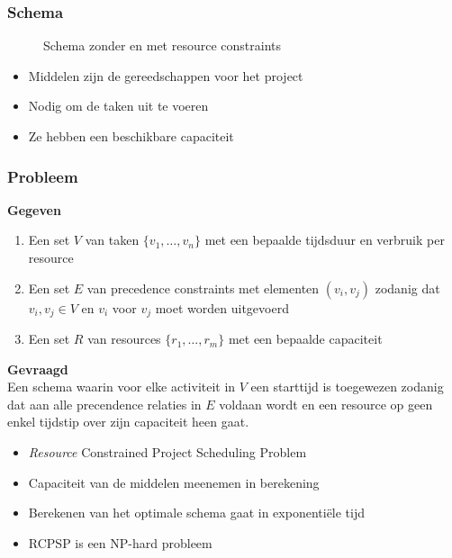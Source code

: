 \documentclass{beamer}
\theoremstyle{definition}
\newcommand{\inputtikz}[1]{}
\begin{document}
\begin{frame}
\frametitle{Schema}
	\vspace{-1.2em}
	\begin{figure}[ht]
		\makebox[\textwidth][c]{\resizebox{.36\paperwidth}{!}{
			\inputtikz{schedule_infeasible_colored_profile}
		}}
		\vspace{-1.3em}
		\caption{Schema zonder en met resource constraints}
	\end{figure}
\end{frame}

\begin{frame}
	\begin{itemize}
		\item Middelen zijn de gereedschappen voor het project
		\item Nodig om de taken uit te voeren
		\item Ze hebben een beschikbare capaciteit
	\end{itemize}
\end{frame}

\begin{frame}
	\frametitle{Probleem}
	\textbf{Gegeven}
	\begin{enumerate}
		\item Een set $V$ van taken $\{v_1,\dots,v_n\}$ met een bepaalde tijdsduur en verbruik per resource
		\item Een set $E$ van precedence constraints met elementen $(v_i, v_j)$ zodanig dat $v_i, v_j \in V$ en $v_i$ voor $v_j$ moet worden uitgevoerd
		\item Een set $R$ van resources $\{r_1, \ldots, r_m\}$ met een bepaalde capaciteit
	\end{enumerate}
	
	\textbf{Gevraagd}\\
	Een schema waarin voor elke activiteit in $V$ een starttijd is toegewezen zodanig dat aan alle precendence relaties in $E$ voldaan wordt en een resource op geen enkel tijdstip over zijn capaciteit heen gaat.
\end{frame}

\begin{frame}
	\begin{itemize}
		\item \emph{Resource} Constrained Project Scheduling Problem
		\item Capaciteit van de middelen meenemen in berekening
		\item Berekenen van het optimale schema gaat in exponenti\"{e}le tijd
		\item RCPSP is een NP-hard probleem
	\end{itemize}
\end{frame}
\end{document}
